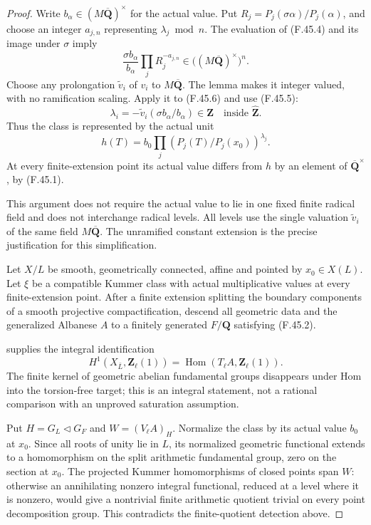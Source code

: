 \begin{proof}
Write \(b_\alpha\in(M\overline{\mathbf Q})^\times\) for the actual
value. Put \(R_j=P_j(\sigma\alpha)/P_j(\alpha)\), and choose an integer
\(a_{j,n}\) representing \(\lambda_j\bmod n\). The evaluation of \textup{(F.45.4)}
and its image under \(\sigma\) imply
\[
  \frac{\sigma b_\alpha}{b_\alpha}
        \prod_jR_j^{-a_{j,n}}
               \in\bigl((M\overline{\mathbf Q})^\times\bigr)^n.
                                                               \tag{F.45.6}
\]
Choose any prolongation \(\widetilde v_i\) of \(v_i\) to
\(M\overline{\mathbf Q}\). The lemma makes it integer valued, with no
ramification scaling. Apply it to \textup{(F.45.6)} and use \textup{(F.45.5)}:
\[
 \lambda_i=-\widetilde v_i(\sigma b_\alpha/b_\alpha)
                    \in\mathbf Z
             \quad\text{inside }\widehat{\mathbf Z}.       \tag{F.45.7}
\]
Thus the class is represented by the actual unit
\[
 h(T)=b_0\prod_j\left(P_j(T)/P_j(x_0)\right)^{\lambda_j}.
\]
At every finite-extension point its actual value differs from \(h\) by
an element of \(\overline{\mathbf Q}^{\times}\), by \textup{(F.45.1)}.

This argument does not require the actual value to lie in one fixed
finite radical field and does not interchange radical levels. All levels
use the single valuation \(\widetilde v_i\) of the same field
\(M\overline{\mathbf Q}\). The unramified constant extension is the
precise justification for this simplification.


Let \(X/L\) be smooth, geometrically connected, affine and pointed by
\(x_0\in X(L)\). Let \(\xi\) be a compatible Kummer class with actual
multiplicative values at every finite-extension point. After a finite
extension splitting the boundary components of a smooth projective
compactification, descend all geometric data and the generalized Albanese
\(A\) to a finitely generated \(F/\mathbf Q\) satisfying \textup{(F.45.2)}.

\citet[Propositions~4.1 and~4.3, Corollary~4.2]{F_SpiessSzamuely2003} supplies the
integral identification
\[
 H^1(X_{\bar L},\mathbf Z_\ell(1))
       =\operatorname{Hom}(T_\ell A,\mathbf Z_\ell(1)).     \tag{F.45.8}
\]
The finite kernel of geometric abelian fundamental groups disappears
under Hom into the torsion-free target; this is an integral statement,
not a rational comparison with an unproved saturation assumption.

Put \(H=G_L\triangleleft G_F\) and \(W=(V_\ell A)_H\). Normalize the
class by its actual value \(b_0\) at \(x_0\). Since all roots of unity
lie in \(L\), its normalized geometric functional extends to a
homomorphism on the split arithmetic fundamental group, zero on the
section at \(x_0\). The projected Kummer homomorphisms of closed points
span \(W\): otherwise an annihilating nonzero integral functional,
reduced at a level where it is nonzero, would give a nontrivial finite
arithmetic quotient trivial on every point decomposition group. This
contradicts the finite-quotient detection above.


\end{proof}
